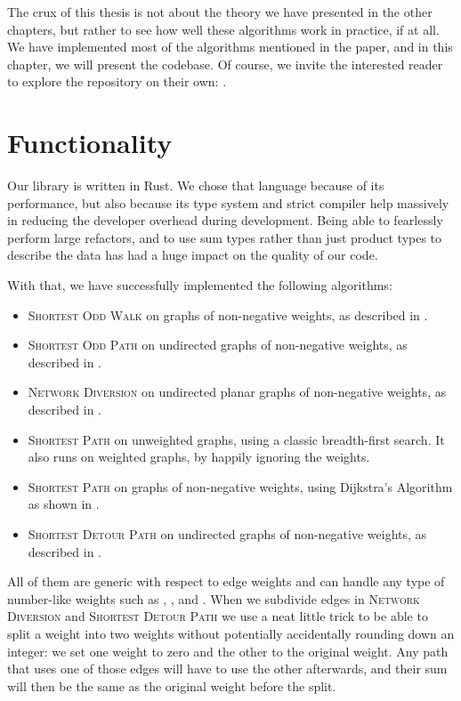 The crux of this thesis is not about the theory we have presented in the other chapters, but rather to see how well these algorithms work in practice, if at all. We have implemented most of the algorithms mentioned in the paper, and in this chapter, we will present the codebase. Of course, we invite the interested reader to explore the repository on their own: \cite{source:codebase}.

\section{Functionality}
Our library is written in Rust. We chose that language because of its performance, but also because its type system and strict compiler help massively in reducing the developer overhead during development. Being able to fearlessly perform large refactors, and to use sum types rather than just product types to describe the data has had a huge impact on the quality of our code.

With that, we have successfully implemented the following algorithms:

\begin{itemize}
    \item \textsc{Shortest Odd Walk} on graphs of non-negative weights, as described in .
    \item \textsc{Shortest Odd Path} on undirected graphs of non-negative weights, as described in .
    \item \textsc{Network Diversion} on undirected planar graphs of non-negative weights, as described in .
    \item \textsc{Shortest Path} on unweighted graphs, using a classic breadth-first search. It also runs on weighted graphs, by happily ignoring the weights.
    \item \textsc{Shortest Path} on graphs of non-negative weights, using Dijkstra's Algorithm as shown in .
    \item \textsc{Shortest Detour Path} on undirected graphs of non-negative weights, as described in .
\end{itemize}

All of them are generic with respect to edge weights and can handle any type of number-like weights such as , , and . When we subdivide edges in \textsc{Network Diversion} and \textsc{Shortest Detour Path} we use a neat little trick to be able to split a weight into two weights without potentially accidentally rounding down an integer: we set one weight to zero and the other to the original weight. Any path that uses one of those edges will have to use the other afterwards, and their sum will then be the same as the original weight before the split.
